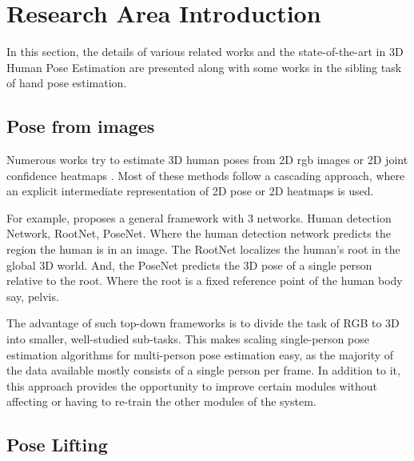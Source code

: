 
\section{Research Area Introduction}

\label{sec:Research area introduction}



In this section, the details of various related works and the 
state-of-the-art in 3D Human Pose Estimation are presented along with some 
works in the sibling task of hand pose estimation.



\subsection{Pose from images}

Numerous works try to estimate 3D human poses from 2D \ac{rgb} images or 2D 
joint confidence heatmaps \cite{CameraDistanceAware, poselifter, 
DistillNRSfM, occlusionVideo}. Most of these methods follow a cascading 
approach, where an explicit intermediate representation of 2D pose or 2D 
heatmaps is used.



For example, \cite{CameraDistanceAware} proposes a general framework with 3 
networks. Human detection Network, RootNet, PoseNet. Where the human 
detection network predicts the region the human is in an image. The RootNet 
localizes the human's root in the global 3D world. And, the PoseNet 
predicts the 3D pose of a single person relative to the root. Where the 
root is a fixed reference point of the human body say, pelvis.



The advantage of such top-down frameworks is to divide the task of RGB to 
3D into smaller, well-studied sub-tasks. This makes scaling single-person 
pose estimation algorithms for multi-person pose estimation easy, as the 
majority of the data available mostly consists of a single person per 
frame. In addition to it, this approach provides the opportunity to improve 
certain modules without affecting or having to re-train the other modules 
of the system.



\subsection{Pose Lifting}



